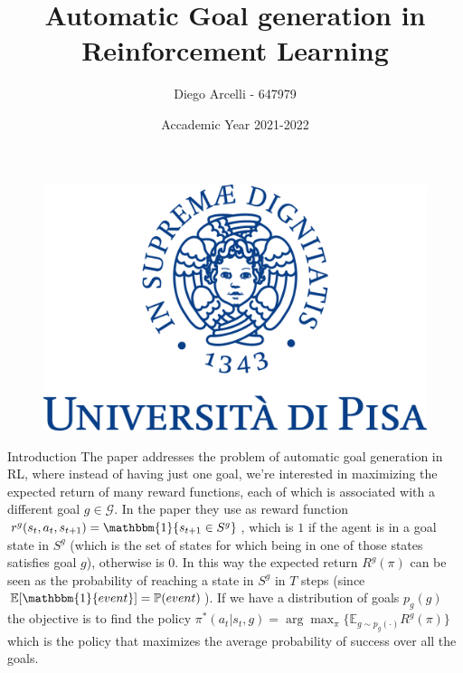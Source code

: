 \documentclass{beamer}
\author[Diego Arcelli]{ Diego Arcelli - 647979}
\title[Automatic Goal Generation in RL]{Automatic Goal generation in Reinforcement Learning}
\institute [University of Pisa] {University of Pisa}
\date{\scriptsize Accademic Year 2021-2022}
\begin{document}
	
	\begin{frame}
		\titlepage
		\begin{figure}[htpb]
			\begin{center}
				\includegraphics[width=0.3\linewidth]{images/unipi-logo.png}
			\end{center}
		\end{figure}
	\end{frame}
	

	
	\begin{frame}{Introduction}
		The paper addresses the problem of automatic goal generation in RL, where instead of having just one goal, we're interested in maximizing the expected return of many reward functions, each of which is associated with a different goal $g \in \mathcal{G}$. In the paper they use as reward function $r^g(s_t, a_t, s_{t+1}) = \mathbbm{1}\{s_{t+1} \in S^g\}$, which is $1$ if the agent is in a goal state in $S^g$ (which is the set of states for which being in one of those states satisfies goal $g$), otherwise is 0. In this way the expected return $R^g(\pi)$ can be seen as the probability of reaching a state in $S^g$ in $T$ steps (since $\mathbb{E}[\mathbbm{1}\{event\}] = \mathbb{P}(event)$). If we have a distribution of goals $p_g(g)$ the objective is to find the policy
		$ \pi^*(a_t|s_t, g) = \arg\max_{\pi} \{ \mathbb{E}_{g \sim p_g(\cdot)}R^g(\pi) \}$
		which is the policy that maximizes the average probability of success over all the goals.
	\end{frame}
\end{document}
